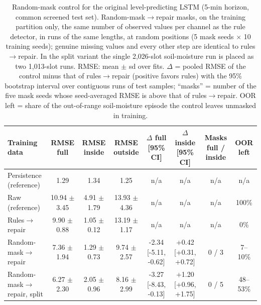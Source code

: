 \begin{table}[!t]
\footnotesize
\begin{center}
\caption{Random-mask control for the original level-predicting LSTM (5-min horizon, common screened test set). Random-mask$\rightarrow$repair masks, on the training partition only, the same number of observed values per channel as the rule detector, in runs of the same lengths, at random positions (5 mask seeds $\times$ 10 training seeds); genuine missing values and every other step are identical to rules$\rightarrow$repair. In the split variant the single 2,026-slot soil-moisture run is placed as two 1,013-slot runs. RMSE: mean $\pm$ sd over fits. $\Delta$ = pooled RMSE of the control minus that of rules$\rightarrow$repair (positive favors rules) with the 95\% bootstrap interval over contiguous runs of test samples; ``masks'' = number of the five mask seeds whose seed-averaged RMSE is above that of rules$\rightarrow$repair. OOR left = share of the out-of-range soil-moisture episode the control leaves unmasked in training.}
\label{tab:randomcontrol}
\setlength{\tabcolsep}{3pt}
\begin{tabular}{lccccccc}
\toprule
\textbf{Training data} & \textbf{RMSE full} & \textbf{RMSE inside} & \textbf{RMSE outside} & \textbf{$\Delta$ full [95\% CI]} & \textbf{$\Delta$ inside [95\% CI]} & \textbf{Masks full / inside} & \textbf{OOR left} \\
\midrule
Persistence (reference) & 1.29 & 1.34 & 1.25 & n/a & n/a & n/a & n/a \\
Raw (reference) & 10.94 $\pm$ 3.45 & 4.91 $\pm$ 1.79 & 13.93 $\pm$ 4.36 & n/a & n/a & n/a & 100\% \\
Rules$\rightarrow$repair & 9.90 $\pm$ 0.88 & 1.05 $\pm$ 0.12 & 13.19 $\pm$ 1.17 & n/a & n/a & n/a & 0\% \\
Random-mask$\rightarrow$repair & 7.36 $\pm$ 1.94 & 1.29 $\pm$ 0.73 & 9.74 $\pm$ 2.57 & -2.34 [-5.11, -0.62] & +0.42 [+0.31, +0.72] & 0 / 3 & 7--10\% \\
Random-mask$\rightarrow$repair, split & 6.27 $\pm$ 2.30 & 2.05 $\pm$ 0.96 & 8.16 $\pm$ 2.99 & -3.27 [-8.43, -0.13] & +1.20 [+0.96, +1.75] & 0 / 5 & 48--53\% \\
\bottomrule
\end{tabular}
\end{center}
\end{table}
